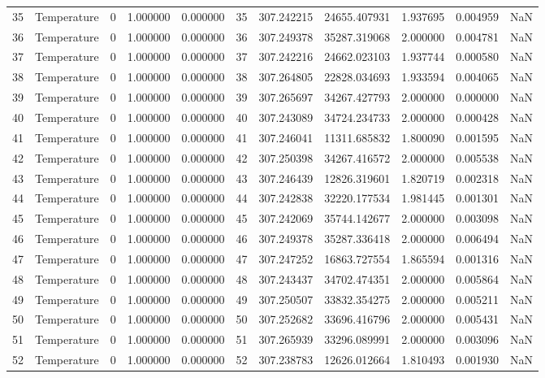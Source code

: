 \begin{tabular}{llrrrrrrrrr}
35 & Temperature & 0 & 1.000000 & 0.000000 & 35 & 307.242215 & 24655.407931 & 1.937695 & 0.004959 & NaN \\
36 & Temperature & 0 & 1.000000 & 0.000000 & 36 & 307.249378 & 35287.319068 & 2.000000 & 0.004781 & NaN \\
37 & Temperature & 0 & 1.000000 & 0.000000 & 37 & 307.242216 & 24662.023103 & 1.937744 & 0.000580 & NaN \\
38 & Temperature & 0 & 1.000000 & 0.000000 & 38 & 307.264805 & 22828.034693 & 1.933594 & 0.004065 & NaN \\
39 & Temperature & 0 & 1.000000 & 0.000000 & 39 & 307.265697 & 34267.427793 & 2.000000 & 0.000000 & NaN \\
40 & Temperature & 0 & 1.000000 & 0.000000 & 40 & 307.243089 & 34724.234733 & 2.000000 & 0.000428 & NaN \\
41 & Temperature & 0 & 1.000000 & 0.000000 & 41 & 307.246041 & 11311.685832 & 1.800090 & 0.001595 & NaN \\
42 & Temperature & 0 & 1.000000 & 0.000000 & 42 & 307.250398 & 34267.416572 & 2.000000 & 0.005538 & NaN \\
43 & Temperature & 0 & 1.000000 & 0.000000 & 43 & 307.246439 & 12826.319601 & 1.820719 & 0.002318 & NaN \\
44 & Temperature & 0 & 1.000000 & 0.000000 & 44 & 307.242838 & 32220.177534 & 1.981445 & 0.001301 & NaN \\
45 & Temperature & 0 & 1.000000 & 0.000000 & 45 & 307.242069 & 35744.142677 & 2.000000 & 0.003098 & NaN \\
46 & Temperature & 0 & 1.000000 & 0.000000 & 46 & 307.249378 & 35287.336418 & 2.000000 & 0.006494 & NaN \\
47 & Temperature & 0 & 1.000000 & 0.000000 & 47 & 307.247252 & 16863.727554 & 1.865594 & 0.001316 & NaN \\
48 & Temperature & 0 & 1.000000 & 0.000000 & 48 & 307.243437 & 34702.474351 & 2.000000 & 0.005864 & NaN \\
49 & Temperature & 0 & 1.000000 & 0.000000 & 49 & 307.250507 & 33832.354275 & 2.000000 & 0.005211 & NaN \\
50 & Temperature & 0 & 1.000000 & 0.000000 & 50 & 307.252682 & 33696.416796 & 2.000000 & 0.005431 & NaN \\
51 & Temperature & 0 & 1.000000 & 0.000000 & 51 & 307.265939 & 33296.089991 & 2.000000 & 0.003096 & NaN \\
52 & Temperature & 0 & 1.000000 & 0.000000 & 52 & 307.238783 & 12626.012664 & 1.810493 & 0.001930 & NaN \\

\end{tabular}
